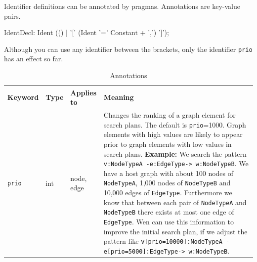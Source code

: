 Identifier definitions can be annotated by pragmas. Annotations are key-value pairs.
\begin{rail}
  IdentDecl: Ident (() | '[' (Ident '=' Constant + ',') ']');
\end{rail}
Although you can use any identifier between the brackets, only the identifier \texttt{prio} has an effect so far.
\begin{table}[htbp]
\begin{tabularx}{\linewidth}{|lllX|} \hline
  \textbf{Keyword} & \textbf{Type} & \textbf{Applies to} & \textbf{Meaning} \\ \hline
  \texttt{prio} & int & node, edge & Changes the ranking of a graph element for search plans. The default is \texttt{prio}=1000. Graph elements with high values are likely to appear prior to graph elements with low values in search plans. {\small \textbf{Example:} We search the pattern \texttt{v:NodeTypeA -e:EdgeType-> w:NodeTypeB}. We have a host graph with about 100 nodes of \texttt{NodeTypeA}, 1,000 nodes of \texttt{NodeTypeB} and 10,000 edges of \texttt{EdgeType}. Furthermore we know that between each pair of \texttt{NodeTypeA} and \texttt{NodeTypeB} there exists at most one edge of \texttt{EdgeType}. Wen can use this information to improve the initial search plan, if we adjust the pattern like \texttt{v[prio=10000]:NodeTypeA -e[prio=5000]:EdgeType-> w:NodeTypeB}}. \\ \hline
\end{tabularx}
\caption{Annotations}
\label{tabannotations}
\end{table}


